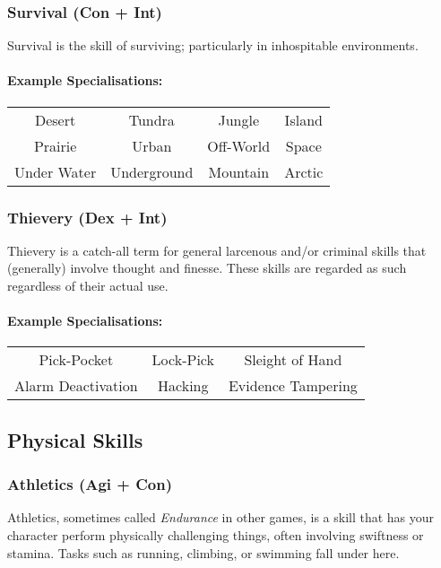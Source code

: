 \subsubsection{Survival (Con + Int)}
Survival is the skill of surviving; particularly in inhospitable environments.

\paragraph{Example Specialisations:}
\begin{center}
    \begin{tabular}{c|c|c|c}
        Desert & Tundra & Jungle & Island \\
        Prairie & Urban & Off-World & Space \\
        Under Water & Underground & Mountain & Arctic \\
    \end{tabular}
\end{center}

\subsubsection{Thievery (Dex + Int)}
Thievery is a catch-all term for general larcenous and/or criminal skills that (generally) involve thought and finesse.
These skills are regarded as such regardless of their actual use.

\paragraph{Example Specialisations:}
\begin{center}
    \begin{tabular}{c|c|c}
        Pick-Pocket & Lock-Pick & Sleight of Hand \\
        Alarm Deactivation & Hacking & Evidence Tampering \\
    \end{tabular}
\end{center}

\subsection{Physical Skills}
\subsubsection{Athletics (Agi + Con)}
Athletics, sometimes called \textit{Endurance} in other games, is a skill that has your character perform physically challenging things, often involving swiftness or stamina.
Tasks such as running, climbing, or swimming fall under here.

